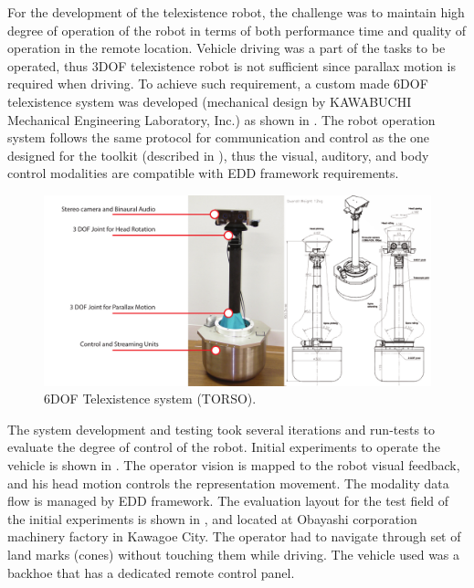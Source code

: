 For the development of the telexistence robot, the challenge was to maintain high degree of operation of the robot in terms of both performance time and quality of operation in the remote location. Vehicle driving was a part of the tasks to be operated, thus 3DOF telexistence robot is not sufficient since parallax motion is required when driving. To achieve such requirement, a custom made 6DOF telexistence system was developed (mechanical design by KAWABUCHI Mechanical Engineering Laboratory, Inc.) as shown in . The robot operation system follows the same protocol for communication and control as the one designed for the toolkit (described in ), thus the visual, auditory, and body control modalities are compatible with EDD framework requirements. 


\begin{figure}[h!]
  \centering
	  \includegraphics[width=1\linewidth]{figures/eval/NEDO/TORSO2.pdf}
  \captionsetup{justification=centering}
  \caption{6DOF Telexistence system (TORSO).}
  \label{fig:usability-nedo-torso}
\end{figure}



The system development and testing took several iterations and run-tests to evaluate the degree of control of the robot. Initial experiments to operate the vehicle is shown in . The operator vision is mapped to the robot visual feedback, and his head motion controls the representation movement. The modality data flow is managed by EDD framework. The evaluation layout for the test field of the initial experiments is shown in , and located at Obayashi corporation machinery factory in Kawagoe City. The operator had to navigate through set of land marks (cones) without touching them while driving. The vehicle used was a backhoe that has a dedicated remote control panel.

